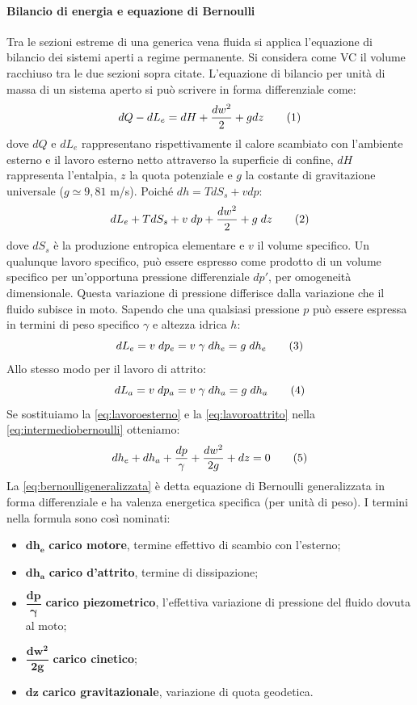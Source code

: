 \paragraph{Bilancio di energia e equazione di Bernoulli}
Tra le sezioni estreme di una generica vena fluida si applica l'equazione di bilancio dei sistemi aperti a regime permanente. Si considera come VC il volume racchiuso tra le due sezioni sopra citate. L'equazione di bilancio per unità di massa di un sistema aperto si può scrivere in forma differenziale come:
\[dQ-dL_e=dH+\frac{dw^2}{2}+gdz\addtag\]
dove $dQ$ e $dL_e$ rappresentano rispettivamente il calore scambiato con l'ambiente esterno e il lavoro esterno netto attraverso la superficie di confine, $dH$ rappresenta l'entalpia, $z$ la quota potenziale e \(g\) la costante di gravitazione universale (\(g \simeq 9,81\) m/s). Poiché $dh=TdS_s+vdp$:
\[dL_e+TdS_s+v \; dp+\frac{dw^2}{2}+g \; dz\label{eq:intermediobernoulli}\addtag\]
dove $dS_s$ è la produzione entropica elementare e $v$ il volume specifico. Un qualunque lavoro specifico, può essere espresso come prodotto di un volume specifico per un'opportuna pressione differenziale $dp'$, per omogeneità dimensionale. Questa variazione di pressione differisce dalla variazione che il fluido subisce in moto. Sapendo che una qualsiasi pressione $p$ può essere espressa in termini di peso specifico $\gamma$ e altezza idrica $h$:
\[dL_e=v\;dp_e=v\;\gamma\;dh_e=g\;dh_e\addtag\label{eq:lavoroesterno}\]
Allo stesso modo per il lavoro di attrito:
\[dL_a=v\;dp_a=v\;\gamma\;dh_a=g\;dh_a\addtag\label{eq:lavoroattrito}\]
Se sostituiamo la \eqref{eq:lavoroesterno} e la \eqref{eq:lavoroattrito} nella \eqref{eq:intermediobernoulli} otteniamo:
\[dh_e+dh_a+\frac{dp}{\gamma}+\frac{dw^2}{2g}+dz=0\label{eq:bernoulligeneralizzata}\addtag\]
La \eqref{eq:bernoulligeneralizzata} è detta equazione di Bernoulli generalizzata in forma differenziale e ha valenza energetica specifica (per unità di peso). I termini nella formula sono così nominati:
\begin{itemize}
    \item \(\mathbf{dh_e}\) \textbf{carico motore}, termine effettivo di scambio con l'esterno;
    \item \(\mathbf{dh_a}\) \textbf{carico d'attrito}, termine di dissipazione;
    \item \(\mathbf{\dfrac{dp}{\gamma}}\) \textbf{carico piezometrico}, l'effettiva variazione di pressione del fluido dovuta al moto;
    \item \(\mathbf{\dfrac{dw^2}{2g}}\) \textbf{carico cinetico};
    \item \(\mathbf{dz}\) \textbf{carico gravitazionale}, variazione di quota geodetica. 
\end{itemize}
